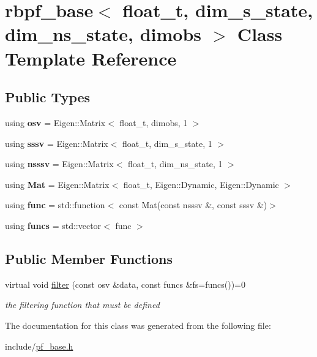 \hypertarget{classrbpf__base}{}\section{rbpf\+\_\+base$<$ float\+\_\+t, dim\+\_\+s\+\_\+state, dim\+\_\+ns\+\_\+state, dimobs $>$ Class Template Reference}
\label{classrbpf__base}
\subsection*{Public Types}
\begin{DoxyCompactItemize}
\item 
\mbox{\label{classrbpf__base_a232936f9aba33d2cb3ec0a74d86ff673}} 
using {\bfseries osv} = Eigen\+::\+Matrix$<$ float\+\_\+t, dimobs, 1 $>$
\item 
\mbox{\label{classrbpf__base_ab2eccf330f9b74a01b4131ebf650fc45}} 
using {\bfseries sssv} = Eigen\+::\+Matrix$<$ float\+\_\+t, dim\+\_\+s\+\_\+state, 1 $>$
\item 
\mbox{\label{classrbpf__base_af80df010347845efac98659ecf7bb1f2}} 
using {\bfseries nsssv} = Eigen\+::\+Matrix$<$ float\+\_\+t, dim\+\_\+ns\+\_\+state, 1 $>$
\item 
\mbox{\label{classrbpf__base_a195c55dcd55fb4a1a5a08c44603bd683}} 
using {\bfseries Mat} = Eigen\+::\+Matrix$<$ float\+\_\+t, Eigen\+::\+Dynamic, Eigen\+::\+Dynamic $>$
\item 
\mbox{\label{classrbpf__base_ab97a27bf3704125176265f8cbb1ccb75}} 
using {\bfseries func} = std\+::function$<$ const Mat(const nsssv \&, const sssv \&)$>$
\item 
\mbox{\label{classrbpf__base_a5e2ffe0b6e10136fcac986314664f938}} 
using {\bfseries funcs} = std\+::vector$<$ func $>$
\end{DoxyCompactItemize}
\subsection*{Public Member Functions}
\begin{DoxyCompactItemize}
\item 
\mbox{\label{classrbpf__base_afe22a67962a28c83b8568b96f80e9c7b}} 
virtual void \hyperlink{classrbpf__base_afe22a67962a28c83b8568b96f80e9c7b}{filter} (const osv \&data, const funcs \&fs=funcs())=0
\begin{DoxyCompactList}\small\item\em the filtering function that must be defined \end{DoxyCompactList}\end{DoxyCompactItemize}


The documentation for this class was generated from the following file\+:\begin{DoxyCompactItemize}
\item 
include/\hyperlink{pf__base_8h}{pf\+\_\+base.\+h}\end{DoxyCompactItemize}
